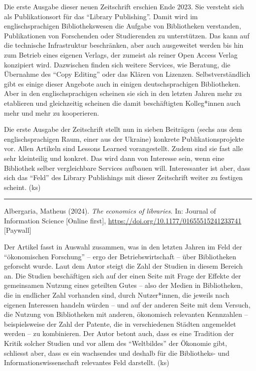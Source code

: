 \documentclass[a4paper,
fontsize=11pt,
oneside,
numbers=noperiodatend,
parskip=half-,
bibliography=totoc,
final
]{scrartcl}
\begin{document}
Die erste Ausgabe dieser neuen Zeitschrift erschien Ende 2023. Sie
versteht sich als Publikationsort für das \enquote{Library Publishing}.
Damit wird im englischsprachigen Bibliothekswesen die Aufgabe von
Bibliotheken verstanden, Publikationen von Forschenden oder Studierenden
zu unterstützen. Das kann auf die technische Infrastruktur beschränken,
aber auch ausgeweitet werden bis hin zum Betrieb eines eigenen Verlags,
der zumeist als reiner Open Access Verlag konzipiert wird. Dazwischen
finden sich weitere Services, wie Beratung, die Übernahme des
\enquote{Copy Editing} oder das Klären von Lizenzen. Selbstverständlich
gibt es einige dieser Angebote auch in einigen deutschsprachigen
Bibliotheken. Aber in den englischsprachigen scheinen sie sich in den
letzten Jahren mehr zu etablieren und gleichzeitig scheinen die damit
beschäftigten Kolleg*innen auch mehr und mehr zu kooperieren.

Die erste Ausgabe der Zeitschrift stellt nun in sieben Beiträgen (sechs
aus dem englischsprachigen Raum, einer aus der Ukraine) konkrete
Publikationsprojekte vor. Allen Artikeln sind Lessons Learned
vorangestellt. Zudem sind sie fast alle sehr kleinteilig und konkret.
Das wird dann von Interesse sein, wenn eine Bibliothek selber
vergleichbare Services aufbauen will. Interessanter ist aber, dass sich
das \enquote{Feld} des Library Publishings mit dieser Zeitschrift weiter
zu festigen scheint. (ks)

\begin{center}\rule{0.5\linewidth}{0.5pt}\end{center}

Albergaria, Matheus (2024). \emph{The economics of libraries}. In:
Journal of Information Science {[}Online first{]},
\url{https://doi.org/10.1177/01655515241233741} {[}Paywall{]}

Der Artikel fasst in Auswahl zusammen, was in den letzten Jahren im Feld
der \enquote{ökonomischen Forschung} -- ergo der Betriebswirtschaft --
über Bibliotheken geforscht wurde. Laut dem Autor steigt die Zahl der
Studien in diesem Bereich an. Die Studien beschäftigen sich auf der
einen Seite mit Frage der Effekte der gemeinsamen Nutzung eines
geteilten Gutes -- also der Medien in Bibliotheken, die in endlicher
Zahl vorhanden sind, durch Nutzer*innen, die jeweils nach eigenen
Interessen handeln würden -- und auf der anderen Seite mit dem Versuch,
die Nutzung von Bibliotheken mit anderen, ökonomisch relevanten
Kennzahlen -- beispielsweise der Zahl der Patente, die in verschiedenen
Städten angemeldet werden -- zu kombinieren. Der Autor betont auch, dass
es eine Tradition der Kritik solcher Studien und vor allem des
\enquote{Weltbildes} der Ökonomie gibt, schliesst aber, dass es ein
wachsendes und deshalb für die Bibliotheks- und Informationswissenschaft
relevantes Feld darstellt. (ks)
\end{document}
